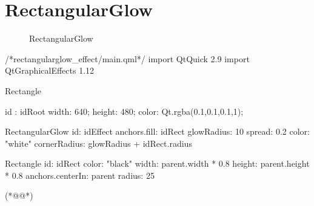 ﻿




\FloatBarrier
\section{
RectangularGlow
}\label{c000015s000024}


\begin{figure}[htb] %
\marginnote{\setlength\fboxsep{2pt}\fbox{\footnotesize{\kaishu\figurename\,}\footnotesize{\ref{p000040}}}}\centering %
\setlength\fboxsep{0pt} %
\caption{RectangularGlow} %
\label{p000040} %
\end{figure}


\label{f000074}    %
\FloatBarrier                                  %
\begin{thebookfilesourceone}[escapeinside={(*@}{@*)},
caption=GoodLuck,
title=\filesourcenumbernameone \thefilesourcenumber
]
/*rectangularglow_effect/main.qml*/
import QtQuick 2.9
import QtGraphicalEffects 1.12

Rectangle {
    id : idRoot
    width: 640;
    height: 480;
    color: Qt.rgba(0.1,0.1,0.1,1);

    RectangularGlow {
        id: idEffect
        anchors.fill: idRect
        glowRadius: 10
        spread: 0.2
        color: "white"
        cornerRadius: glowRadius + idRect.radius
    }

    Rectangle {
        id: idRect
        color: "black"
        width: parent.width * 0.8
        height: parent.height * 0.8
        anchors.centerIn: parent
        radius: 25
    }

}(*@\marginpar[\hfill\setlength\fboxsep{2pt}\fbox{\footnotesize{\kaishu\parbox{1em}{\setlength{\baselineskip}{2pt}\filesourcenumbernameone}}\footnotesize{\thefilesourcenumber}}]{\setlength\fboxsep{2pt}\fbox{\footnotesize{\kaishu\parbox{1em}{\setlength{\baselineskip}{2pt}\filesourcenumbernameone}}\footnotesize{\thefilesourcenumber}}}@*)\end{thebookfilesourceone}          %
\addtocounter{lstlisting}{-1}   %


